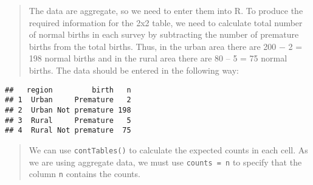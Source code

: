 \documentclass[
]{memoir}
\newenvironment{Shaded}{\begin{snugshade}}{\end{snugshade}}
\newcommand{\AttributeTok}[1]{\textcolor[rgb]{0.77,0.63,0.00}{#1}}
\newcommand{\DecValTok}[1]{\textcolor[rgb]{0.00,0.00,0.81}{#1}}
\newcommand{\FunctionTok}[1]{\textcolor[rgb]{0.00,0.00,0.00}{#1}}
\newcommand{\NormalTok}[1]{#1}
\newcommand{\OtherTok}[1]{\textcolor[rgb]{0.56,0.35,0.01}{#1}}
\newcommand{\SpecialCharTok}[1]{\textcolor[rgb]{0.00,0.00,0.00}{#1}}
\newcommand{\StringTok}[1]{\textcolor[rgb]{0.31,0.60,0.02}{#1}}
\begin{document}
\begin{quote}
The data are aggregate, so we need to enter them into R. To produce the required information for the 2x2 table, we need to calculate total number of normal births in each survey by subtracting the number of premature births from the total births. Thus, in the urban area there are 200 − 2 = 198 normal births and in the rural area there are 80 -- 5 = 75 normal births. The data should be entered in the following way:
\end{quote}

\begin{Shaded}
\end{Shaded}

\begin{verbatim}
##   region         birth   n
## 1  Urban     Premature   2
## 2  Urban Not premature 198
## 3  Rural     Premature   5
## 4  Rural Not premature  75
\end{verbatim}

\begin{quote}
We can use \texttt{contTables()} to calculate the expected counts in each cell. As we are using aggregate data, we must use \texttt{counts\ =\ n} to specify that the column \texttt{n} contains the counts.
\end{quote}
\end{document}
